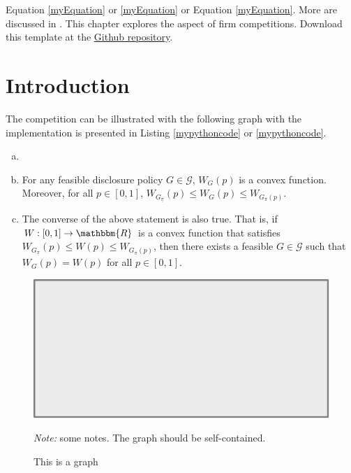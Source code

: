 Equation \ref{myEquation} or \cref{myEquation} or Equation \eqref{myEquation}. \lipsum[105-106] More are discussed in . This chapter explores the aspect of firm competitions. \lipsum[11] \lipsum[11]Download this template at the \href{https://github.com/howardhsumail/Dissertation-LaTeX-Template.git}{Github repository}.

\section{Introduction}

The {\color{mycolor}competition} can be illustrated with the following graph with the implementation is presented in Listing \ref{mypythoncode} or \cref{mypythoncode}.

\begin{lemma}\label{lma1}
  \onehalfspacing
  \begin{enumerate}[(a)]
    \setlength{\itemsep}{-0.5pt}
    \item[] \hfill
    \item For any feasible disclosure policy  $G\in \mathcal{G}$, $W_G(p)$ is a convex function. Moreover, for all $p\in[0,1]$, $W_{G_{\underline{\pi}}}(p)\leq W_G(p)\leq W_{G_{\overline{\pi}}(p)}$.
    \item The converse of the above statement is also true. That is, if $W:[0,1]\to \mathbbm{R}$ is a convex function that satisfies $W_{G_{\underline{\pi}}}(p)\leq W(p)\leq W_{G_{\overline{\pi}}(p)}$, then there exists a feasible $G\in\mathcal{G}$ such that $W_G(p) = W(p)$ for all $p\in[0,1]$.
  \end{enumerate}
\end{lemma}

\lipsum[14]

\begin{figure}[H]
  \centering
  \caption{This is a graph}
  \includegraphics[scale=0.5]{Graph/pic.pdf}
  \hspace*{-0.6cm}
  \begin{minipage}{0.9\textwidth}
    \onehalfspacing
    \vspace*{0.12cm}
    \begin{tablenotes}
      \footnotesize
      \item\textit{Note:} some notes. The graph should be self-contained. \lipsum[66]
    \end{tablenotes}
  \end{minipage}
\end{figure}

